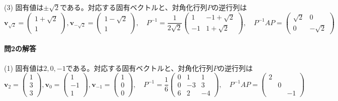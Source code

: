(3) 固有値は$\pm\sqrt{2}$である。対応する固有ベクトルと、対角化行列$P$の逆行列は
\[
\bm{v}_{\sqrt{2}} = 
\begin{pmatrix}
1 + \sqrt{2} \\
1
\end{pmatrix}, 
\bm{v}_{-\sqrt{2}} = 
\begin{pmatrix}
1 - \sqrt{2} \\
1
\end{pmatrix}, \quad
P^{-1} = 
\frac{1}{2\sqrt{2}}
\begin{pmatrix}
1 & -1 + \sqrt{2} \\
-1 & 1 + \sqrt{2}
\end{pmatrix}, \quad
P^{-1} AP =
\begin{pmatrix}
\sqrt{2} & 0 \\
0 & -\sqrt{2}
\end{pmatrix}
\]

\paragraph{問2の解答}

(1) 固有値は$2, 0, -1$である。対応する固有ベクトルと、対角化行列$P$の逆行列は
\[
\bm{v}_{2} = 
\begin{pmatrix}
1 \\
3 \\
3
\end{pmatrix}, 
\bm{v}_{0} = 
\begin{pmatrix}
1 \\
-1 \\
1
\end{pmatrix},
\bm{v}_{-1} = 
\begin{pmatrix}
1 \\
0 \\
0
\end{pmatrix},  \quad
P^{-1} = 
\frac{1}{6}
\begin{pmatrix}
0 & 1 & 1 \\
0 & -3 & 3 \\
6 & 2 & -4
\end{pmatrix}, \quad
P^{-1} AP =
\begin{pmatrix}
2 \\
 & 0 \\
 & & -1
\end{pmatrix}
\]

